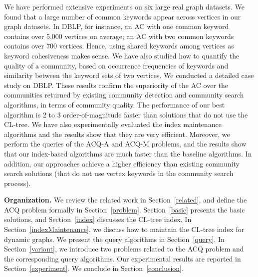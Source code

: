 We have performed extensive experiments on six large real graph datasets.
We found that a large number of common keywords appear across vertices in our graph datasets. In DBLP, for instance, an AC with one common keyword contains over 5,000 vertices on average; an AC with two common keywords contains over 700 vertices. Hence, using shared keywords among vertices as keyword cohesiveness makes sense.
We have also studied how to quantify the quality of a community, based on occurrence frequencies of keywords and similarity between the keyword sets of two vertices. We conducted a detailed case study on DBLP. These results confirm the superiority of the AC over the communities returned by existing community detection and community search algorithms, in terms of community quality. The performance of our best algorithm is 2 to 3 order-of-magnitude faster than solutions that do not use the CL-tree.
We have also experimentally evaluated the index maintenance algorithms and the results show that they are very efficient.
Moreover, we perform the queries of the ACQ-A and ACQ-M problems, and the results show that our index-based algorithms are much faster than the baseline algorithms. In addition, our approaches achieve a higher efficiency than existing community search solutions (that do not use vertex keywords in the community search process).

{\bf Organization.} We review the related work in Section~\ref{related}, and define the ACQ problem formally in Section~\ref{problem}. Section~\ref{basic} presents the basic solutions, and Section~\ref{index} discusses the CL-tree index.
In Section~\ref{indexMaintenance}, we discuss how to maintain the CL-tree index for dynamic graphs.
We present the query algorithms in Section~\ref{query}.
In Section~\ref{variant}, we introduce two problems related to the ACQ problem and the corresponding query algorithms.
Our experimental results are reported in Section~\ref{experiment}.
We conclude in Section~\ref{conclusion}. 